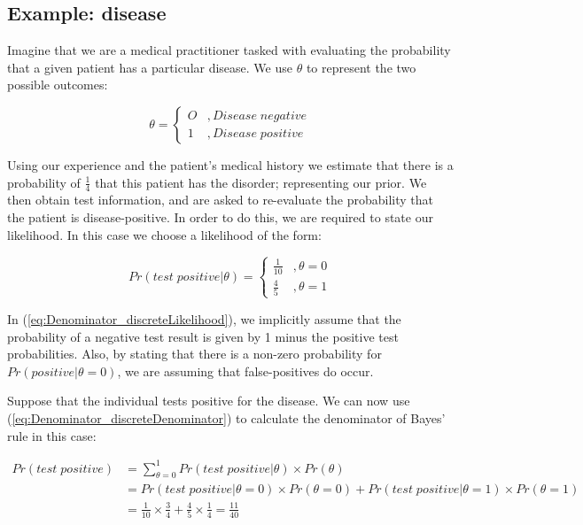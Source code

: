 \documentclass[11pt,fullpage]{book}
\begin{document}
\subsection{Example: disease}\label{sec:Denominator_discreteExample}
Imagine that we are a medical practitioner tasked with evaluating the probability that a given patient has a particular disease. We use $\theta$ to represent the two possible outcomes: 

\begin{equation}
\theta =
\begin{cases}
O & , Disease \; negative \\
1 & ,  Disease \; positive
\end{cases}
\end{equation}

Using our experience and the patient's medical history we estimate that there is a probability of $\frac{1}{4}$ that this patient has the disorder; representing our prior. We then obtain test information, and are asked to re-evaluate the probability that the patient is disease-positive. In order to do this, we are required to state our likelihood. In this case we choose a likelihood of the form:

\begin{equation}\label{eq:Denominator_discreteLikelihood}
Pr(test\;positive|\theta) =
\begin{cases}
\frac{1}{10} & , \theta=0\\
\frac{4}{5} & ,  \theta=1
\end{cases}
\end{equation}

In (\ref{eq:Denominator_discreteLikelihood}), we implicitly assume that the probability of a negative test result is given by 1 minus the positive test probabilities. Also, by stating that there is a non-zero probability for $Pr(positive|\theta=0)$, we are assuming that false-positives do occur.

Suppose that the individual tests positive for the disease. We can now use (\ref{eq:Denominator_discreteDenominator}) to calculate the denominator of Bayes' rule in this case:


\begin{align}
Pr(test\; positive) &= \sum\limits_{\theta=0}^{1} Pr(test\; positive|\theta) \times Pr(\theta)\\
&= Pr(test\; positive|\theta=0) \times Pr(\theta=0) + Pr(test\; positive|\theta=1) \times Pr(\theta=1)\\
&= \frac{1}{10} \times \frac{3}{4} + \frac{4}{5} \times \frac{1}{4} = \frac{11}{40}
\end{align}
\end{document}
